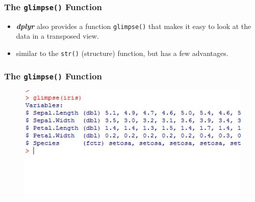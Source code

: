 \documentclass{beamer}
\begin{document}
\begin{frame}[fragile]
	
	\frametitle{The \texttt{glimpse()} Function} 
	\LARGE
	\vspace{-1cm}
	\begin{itemize}
		\item \textbf{\textit{dplyr}} also provides a function \texttt{glimpse()} that makes it easy to look at the data in a transposed view. 
		
		\item similar to the \texttt{str()} (structure) function, but has a few advantages.%
		
	\end{itemize}
\end{frame}
\begin{frame}[fragile]
	
	\frametitle{The \texttt{glimpse()} Function }
	\begin{figure}
		\centering
		\includegraphics[width=1.2\linewidth]{images/irisglimpse}
		
	\end{figure}
	
\end{frame}
\end{document}
